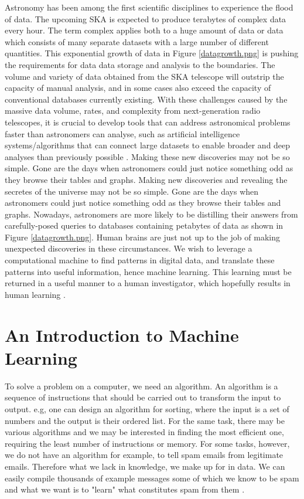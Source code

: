 Astronomy has been among the first scientific disciplines to experience the flood of data. The upcoming SKA is expected to produce terabytes of complex data every hour. The term complex applies both to a huge amount of data or data which consists of many separate datasets with a large number of different quantities. This exponential growth of data in Figure \ref{datagrowth.png} is pushing the requirements for data data storage and analysis to the boundaries. The volume and variety of data obtained from the SKA telescope will outstrip the capacity of manual analysis, and in some cases also exceed the capacity of conventional databases currently existing. With these challenges caused by the massive data volume, rates, and complexity from next-generation radio telescopes, it is crucial to develop tools that can address astronomical problems faster than astronomers can analyse, such as artificial intelligence systems/algorithms that can connect large datasets to enable broader and deep analyses than previously possible \citep{provost2013data}. Making these new discoveries may not be so simple. Gone are the days when astronomers could just notice something odd as they browse their tables and graphs. Making new discoveries and revealing the secretes of the universe may not be so simple. Gone are the days when astronomers could just notice something odd as they browse their tables and graphs. Nowadays, astronomers are more likely to be distilling their answers from carefully-posed queries to databases containing petabytes of data as shown in Figure \ref{datagrowth.png}. Human brains are just not up to the job of making unexpected discoveries in these circumstances. We wish to leverage a computational machine to
find patterns in digital data, and translate these patterns into useful information, hence machine learning. This learning must be returned in a useful manner to a human investigator, which hopefully results in human learning \citep{ball2010data}.

\section{An Introduction to Machine Learning}
\label{Intro}

To solve a problem on a computer, we need an algorithm. An algorithm
is a sequence of instructions that should be carried out to transform
the input to output. e.g, one can design an algorithm for
sorting, where the input is a set of numbers and the output is their ordered
list. For the same task, there may be various algorithms and we may be
interested in finding the most efficient one, requiring the least number of
instructions or memory. For some tasks, however, we do not have an algorithm for example, to tell spam emails from legitimate emails. Therefore what we lack in knowledge, we make up for in data. We can easily compile thousands of example messages some of which we know to be spam and what we want is to "learn" what constitutes spam from them \citep{alpaydin2014introduction}. 

